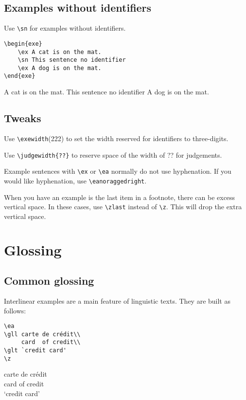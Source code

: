\documentclass[output=paper]{langscibook}
\newcommand{\cmd}[1]{\texttt{\textbackslash#1}}
\begin{document}
\subsection{Examples without identifiers}
Use \cmd{sn} for examples without identifiers.

\begin{minipage}{.55\textwidth}
\begin{lstlisting}
\begin{exe}
    \ex A cat is on the mat. 
    \sn This sentence no identifier
    \ex A dog is on the mat. 
\end{exe}
 \end{lstlisting}
\end{minipage}
\parbox{.45\textwidth}{
\begin{exe}
    \ex A cat is on the mat. 
    \sn This sentence no identifier
    \ex A dog is on the mat. 
\end{exe}
}

\subsection{Tweaks}
Use \cmd{exewidth}{(222)} to set the width reserved for identifiers to three-digits. 

Use \cmd{judgewidth\{??\}} to reserve space of the width of ?? for judgements. 

Example sentences with \cmd{ex} or \cmd{ea} normally do not use hyphenation. If you would like hyphenation, use \cmd{eanoraggedright}.

When you have an example is the last item in a footnote, there can be excess vertical space. In these cases, use \cmd{zlast} instead of \cmd{z}. This will drop the extra vertical space.

 
\section{Glossing}
\subsection{Common glossing}
Interlinear examples are a main feature of linguistic texts. They are built as follows: 

\begin{minipage}{.55\textwidth}
\begin{lstlisting}
\ea
\gll carte de crédit\\
     card  of credit\\
\glt `credit card'     
\z
 \end{lstlisting}
\end{minipage}
\parbox{.45\textwidth}{ 
\ea
\gll carte de crédit\\
     card  of credit\\
\glt `credit card'     
\z 
}
\end{document}
